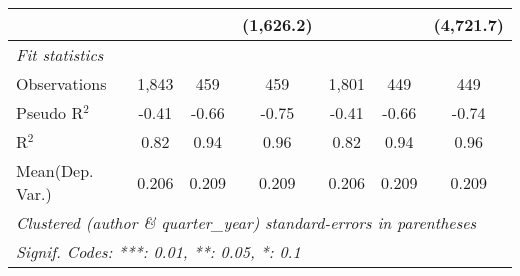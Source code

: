 \begin{tabular}{lcccccc}
                                &              &           & (1,626.2)      &              &           & (4,721.7)\\   
   \midrule
   \emph{Fit statistics}\\
   Observations                 & 1,843        & 459       & 459            & 1,801        & 449       & 449\\  
   Pseudo R$^2$                 & -0.41        & -0.66     & -0.75          & -0.41        & -0.66     & -0.74\\  
   R$^2$                        & 0.82         & 0.94      & 0.96           & 0.82         & 0.94      & 0.96\\  
Mean(Dep. Var.) & 0.206 & 0.209 & 0.209 & 0.206 & 0.209 & 0.209 \\
   \midrule \midrule
   \multicolumn{7}{l}{\emph{Clustered (author \& quarter\_year) standard-errors in parentheses}}\\
   \multicolumn{7}{l}{\emph{Signif. Codes: ***: 0.01, **: 0.05, *: 0.1}}\\
\end{tabular}
\par\endgroup
